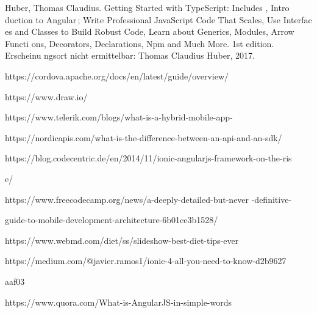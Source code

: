 \documentclass[a4paper,12pt]{article}
\begin{document}
			Huber, Thomas Claudius. Getting Started with TypeScript: Includes ,
			Intro
			duction to Angular ; Write Professional JavaScript Code That Scales, Use Interfac
			es and Classes to Build Robust Code, 
			Learn about Generics, Modules, Arrow Functi
			ons, Decorators, Declarations, Npm and Much More. 1st edition. 
			Erscheinu
			ngsort nicht ermittelbar: Thomas Claudius Huber, 2017.

			https://cordova.apache.org/docs/en/latest/guide/overview/

			https://www.draw.io/

			https://www.telerik.com/blogs/what-is-a-hybrid-mobile-app-
			
			https://nordicapis.com/what-is-the-difference-between-an-api-and-an-sdk/ 
			
			https://blog.codecentric.de/en/2014/11/ionic-angularjs-framework-on-the-ris
			
			e/
			
			https://www.freecodecamp.org/news/a-deeply-detailed-but-never
			-definitive-

			guide-to-mobile-development-architecture-6b01ce3b1528/
			
			https://www.webmd.com/diet/ss/slideshow-best-diet-tips-ever
			
			https://medium.com/@javier.ramos1/ionic-4-all-you-need-to-know-d2b9627
			
			aaf03

			https://www.quora.com/What-is-AngularJS-in-simple-words
			
			
\end{document}

